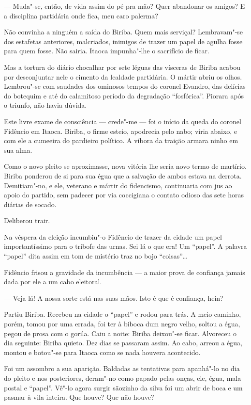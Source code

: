 --- Muda"-se, então, de vida assim do pé pra mão? Quer abandonar os
amigos? E a disciplina partidária onde fica, meu caro palerma?

Não convinha a ninguém a saída do Biriba. Quem mais serviçal?
Lembravam"-se dos estafetas anteriores, malcriados, inimigos de trazer um
papel de agulha fosse para quem fosse. Não sairia. Itaoca impunha"-lhe o
sacrifício de ficar.

Mas a tortura do diário chocalhar por sete léguas das vísceras de Biriba
acabou por desconjuntar nele o cimento da lealdade partidária. O mártir
abriu os olhos. Lembrou"-se com saudades dos ominosos tempos do coronel
Evandro, das delícias do botequim e até do calamitoso período da
degradação ``fosfórica''. Piorara após o triunfo, não havia dúvida.

Este livre exame de consciência --- crede"-me --- foi o início da queda
do coronel Fidêncio em Itaoca. Biriba, o firme esteio, apodrecia pelo
nabo; viria abaixo, e com ele a cumeeira do pardieiro político. A víbora
da traição armara ninho em sua alma.

Como o novo pleito se aproximasse, nova vitória lhe seria novo termo de
martírio. Biriba ponderou de si para sua égua que a salvação de ambos
estava na derrota. Demitiam"-no, e ele, veterano e mártir do fidencismo,
continuaria com jus ao apoio do partido, sem padecer por via coccigiana
o contato odioso das sete horas diárias de socado.

Deliberou trair.

Na véspera da eleição incumbiu"-o Fidêncio de trazer da cidade um papel
importantíssimo para o tribofe das urnas. Sei lá o que era! Um
``papel''. A palavra ``papel'' dita assim em tom de mistério traz no
bojo ``coisas''\ldots{}

Fidêncio frisou a gravidade da incumbência --- a maior prova de
confiança jamais dada por ele a um cabo eleitoral.

--- Veja lá! A nossa sorte está nas suas mãos. Isto é que é confiança,
hein?

Partiu Biriba. Recebeu na cidade o ``papel'' e rodou para trás. A meio
caminho, porém, tomou por uma errada, foi ter à biboca dum negro velho,
soltou a égua, pegou de prosa com o gorila. Caiu a noite: Biriba
deixou"-se ficar. Alvoreceu o dia seguinte: Biriba quieto. Dez dias se
passaram assim. Ao cabo, arreou a égua, montou e botou"-se para Itaoca
como se nada houvera acontecido.

Foi um assombro a sua aparição. Baldadas as tentativas para apanhá"-lo no
dia do pleito e nos posteriores, deram"-no como papado pelas onças, ele,
égua, mala postal e ``papel''. Vê"-lo agora surgir sãozinho da silva foi
um abrir de boca e um pasmar à vila inteira. Que houve? Que não houve?

